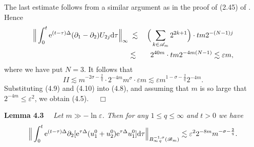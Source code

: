 \documentclass[11pt]{article}
\newcommand{\rmd}{\mbox{\rm d}}
\newcommand{\rme}{{\rm e}}
\begin{document}
  The last estimate follows from a similar argument as in the proof of (2.45) of \cite{Wang}. Hence
\begin{eqnarray*}
  \Big\|\int_0^t\rme^{(t-\tau)\Delta}(\partial_1-\partial_2)U_{2j}\rmd\tau\Big\|_{\infty}
  &\;\lesssim\;& \Big(\sum_{k\in\mathscr{A}_m}2^{2k+1}\Big)\cdot tm2^{-(N-1)j}
\\
  &\lesssim & 2^{40m}\cdot tm2^{-4m(N-1)}\lesssim\varepsilon m,
\end{eqnarray*}
  where we have put $N=3$. It follows that
\begin{equation}
  I\!\!I\lesssim m^{-2\sigma-\frac{2}{q}}\cdot 2^{-4m}m^{\sigma}\cdot\varepsilon m\lesssim\varepsilon m^{1-\sigma-\frac{2}{q}}2^{-4m}.
\end{equation}
  Substituting (4.9) and (4.10) into (4.8), and assuming that $m$ is so large that $2^{-4m}\leqslant\varepsilon^2$, we obtain (4.5). $\quad\Box$
\medskip

  {\bf Lemma 4.3} \ \ {\em Let $m\gg-\ln\varepsilon$. Then for any $1\leqslant q\leqslant\infty$ and $t>0$ we have}
\begin{equation}
  \Big\|\int_0^t\rme^{(t-\tau)\Delta}\partial_2[\rme^{\tau\Delta}(u_1^0+u_2^0)\rme^{\tau\Delta}u_1^0]\rmd\tau
  \Big\|_{B^{-1,\sigma}_{\infty\,q}(\mathscr{B}_m)}\lesssim \varepsilon^2 2^{-8m}m^{-\sigma-\frac{2}{q}}.
\end{equation}
\end{document}
